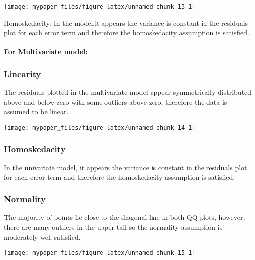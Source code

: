 \documentclass[letterpaper,9pt,twocolumn,twoside,]{pinp}
\begin{document}
\begin{center}\texttt{[image: mypaper\_files/figure-latex/unnamed-chunk-13-1]} \end{center}

Homoskedacity: In the model,it appears the variance is constant in the
residuals plot for each error term and therefore the homoskedacity
assumption is satisfied.

\hypertarget{for-multivariate-model}{%
\paragraph{For Multivariate model:}\label{for-multivariate-model}}

\hypertarget{linearity}{%
\subsubsection{Linearity}\label{linearity}}

The residuals plotted in the multivariate model appear symmetrically
distributed above and below zero with some outliers above zero,
therefore the data is assumed to be linear.

\begin{center}\texttt{[image: mypaper\_files/figure-latex/unnamed-chunk-14-1]} \end{center}

\hypertarget{homoskedacity}{%
\subsubsection{Homoskedacity}\label{homoskedacity}}

In the univariate model, it appears the variance is constant in the
residuals plot for each error term and therefore the homoskedacity
assumption is satisfied.

\hypertarget{normality}{%
\subsubsection{Normality}\label{normality}}

The majority of points lie close to the diagonal line in both QQ plots,
however, there are many outliers in the upper tail so the normality
assumption is moderately well satisfied.

\begin{center}\texttt{[image: mypaper\_files/figure-latex/unnamed-chunk-15-1]} \end{center}
\end{document}
